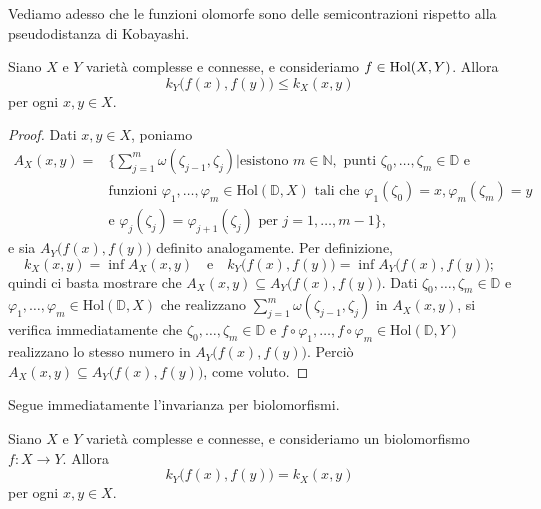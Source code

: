Vediamo adesso che le funzioni olomorfe sono delle semicontrazioni rispetto alla pseudodistanza di Kobayashi.

\begin{prop} \label{semicontr}
    Siano $X$ e $Y$ varietà complesse e connesse, e consideriamo $f \in \textnormal{Hol}(X,Y)$. Allora
    \begin{equation}
        k_Y\big(f(x),f(y)\big) \le k_X(x,y)
    \end{equation}
    per ogni $x,y \in X$.
\end{prop}

\begin{proof}
    Dati $x,y\in X$, poniamo
    \begin{align*}
        A_X(x,y)=&\Bigg\{\sum_{j=1}^m \omega(\zeta_{j-1},\zeta_j) \bigg\vert \text{esistono }m\in\mathbb{N},\text{ punti }\zeta_0,\dots,\zeta_m \in \mathbb{D}\text{ e}\\
        &\text{funzioni }\varphi_1,\dots,\varphi_m\in\text{Hol}(\mathbb{D},X) \text{ tali che } \varphi_1(\zeta_0)=x,\varphi_m(\zeta_m)=y\\
        &\text{e }\varphi_j(\zeta_j)=\varphi_{j+1}(\zeta_j)\text{ per }j=1,\dots,m-1\Bigg\},
    \end{align*}
    e sia $A_Y\big(f(x),f(y)\big)$ definito analogamente. Per definizione,
    $$k_X(x,y)=\inf A_X(x,y)\quad \text{e}\quad k_Y\big(f(x),f(y)\big)=\inf A_Y\big(f(x),f(y)\big);$$
    quindi ci basta mostrare che $A_X(x,y)\subseteq A_Y\big(f(x),f(y)\big)$. Dati $\zeta_0,\dots,\zeta_m \in \mathbb{D}$ e $\varphi_1,\dots,\varphi_m\in\text{Hol}(\mathbb{D},X)$ che realizzano $\displaystyle\sum_{j=1}^m \omega(\zeta_{j-1},\zeta_j)$ in $A_X(x,y)$, si verifica immediatamente che $\zeta_0,\dots,\zeta_m \in \mathbb{D}$ e $f\circ\varphi_1,\dots,f\circ\varphi_m\in\text{Hol}(\mathbb{D},Y)$ realizzano lo stesso numero in $A_Y\big(f(x),f(y)\big)$. Perciò $A_X(x,y)\subseteq A_Y\big(f(x),f(y)\big)$, come voluto.
\end{proof}

Segue immediatamente l'invarianza per biolomorfismi.

\begin{cor} \label{bioloiso}
    Siano $X$ e $Y$ varietà complesse e connesse, e consideriamo un biolomorfismo $f:X \longrightarrow Y$. Allora
    \begin{equation}
        k_Y\big(f(x),f(y)\big)=k_X(x,y)
    \end{equation}
    per ogni $x,y \in X$.
\end{cor}


